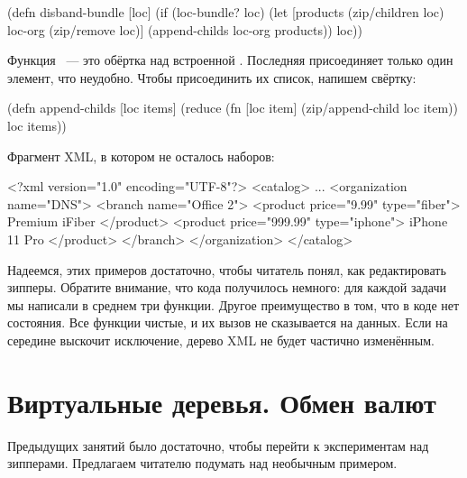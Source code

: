 \begin{english}
  \begin{clojure}
(defn disband-bundle [loc]
  (if (loc-bundle? loc)
    (let [products (zip/children loc)
          loc-org (zip/remove loc)]
      (append-childs loc-org products))
    loc))
  \end{clojure}
\end{english}

Функция ~--- это обёртка над встроенной
. Последняя присоединяет только один элемент, что
неудобно. Чтобы присоединить их список, напишем свёртку:

\begin{english}
  \begin{clojure}
(defn append-childs [loc items]
  (reduce
    (fn [loc item]
      (zip/append-child loc item))
    loc
    items))
  \end{clojure}
\end{english}

Фрагмент XML, в котором не осталось наборов:

\begin{english}
  \begin{xml}
<?xml version="1.0" encoding="UTF-8"?>
<catalog>
  ...
  <organization name="DNS">
    <branch name="Office 2">
      <product price="9.99" type="fiber">
        Premium iFiber
      </product>
      <product price="999.99" type="iphone">
        iPhone 11 Pro
      </product>
    </branch>
  </organization>
</catalog>
  \end{xml}
\end{english}

Надеемся, этих примеров достаточно, чтобы читатель понял, как редактировать
зипперы. Обратите внимание, что кода получилось немного: для каждой задачи мы
написали в среднем три функции. Другое преимущество в том, что в коде нет
состояния. Все функции чистые, и их вызов не сказывается на данных. Если на
середине выскочит исключение, дерево XML не будет частично изменённым.

\section{Виртуальные деревья. Обмен валют}


Предыдущих занятий было достаточно, чтобы перейти к экспериментам над
зипперами. Предлагаем читателю подумать над необычным примером.

